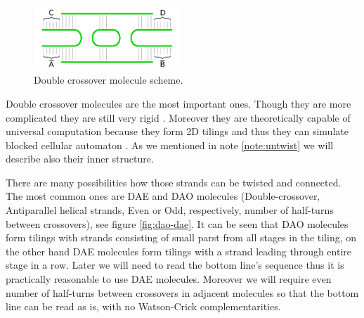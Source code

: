 		\begin{figure}[H]
		\begin{center}
			\includegraphics[width=0.492\textwidth]{./figures/strand_types/double_crossover.pdf}
			\caption{Double crossover molecule scheme.}
			\label{fig:double_crossover}
		\end{center}
		\end{figure}
		
		Double crossover molecules are the most important ones. Though they are more complicated they are still very rigid \cite{seeman93}. Moreover they are theoretically capable of universal computation because they form 2D tilings and thus they can simulate blocked cellular automaton \cite{winfree_phd}. As we mentioned in note \ref{note:untwist} we will describe also their inner structure. %
		
		There are many possibilities how those strands can be twisted and connected. The most common ones are DAE and DAO molecules (Double-crossover, Antiparallel helical strands, Even or Odd, respectively, number of half-turns between crossovers), see figure \ref{fig:dao-dae}. It can be seen that DAO molecules form tilings with strands consisting of small parst from all stages in the tiling, on the other hand DAE molecules form tilings with a strand leading through entire stage in a row. Later we will need to read the bottom line's sequence thus it is practically reasonable to use DAE molecules. Moreover we will require even number of half-turns between crossovers in adjacent molecules so that the bottom line can be read as is, with no Watson-Crick complementarities.
		
